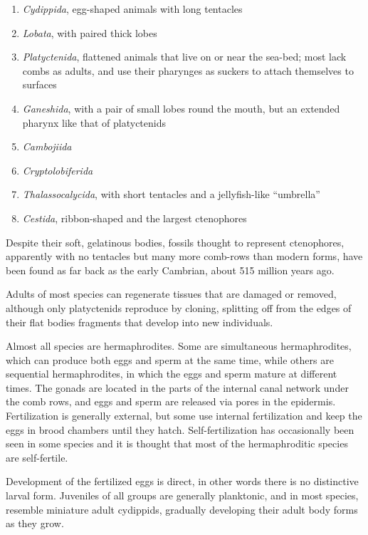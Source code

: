\documentclass[]{book}
\providecommand{\tightlist}{%
  \setlength{\itemsep}{0pt}\setlength{\parskip}{0pt}}
\theoremstyle{definition}
\theoremstyle{definition}
\theoremstyle{definition}
\theoremstyle{remark}
\begin{document}
\begin{enumerate}
\def\labelenumi{\arabic{enumi}.}
\tightlist
\item
  \emph{Cydippida}, egg-shaped animals with long tentacles
\item
  \emph{Lobata}, with paired thick lobes
\item
  \emph{Platyctenida}, flattened animals that live on or near the
  sea-bed; most lack combs as adults, and use their pharynges as suckers
  to attach themselves to surfaces
\item
  \emph{Ganeshida}, with a pair of small lobes round the mouth, but an
  extended pharynx like that of platyctenids
\item
  \emph{Cambojiida}
\item
  \emph{Cryptolobiferida}
\item
  \emph{Thalassocalycida}, with short tentacles and a jellyfish-like
  ``umbrella''
\item
  \emph{Cestida}, ribbon-shaped and the largest ctenophores
\end{enumerate}

Despite their soft, gelatinous bodies, fossils thought to represent
ctenophores, apparently with no tentacles but many more comb-rows than
modern forms, have been found as far back as the early Cambrian, about
515 million years ago.

Adults of most species can regenerate tissues that are damaged or
removed, although only platyctenids reproduce by cloning, splitting off
from the edges of their flat bodies fragments that develop into new
individuals.

Almost all species are hermaphrodites. Some are simultaneous
hermaphrodites, which can produce both eggs and sperm at the same time,
while others are sequential hermaphrodites, in which the eggs and sperm
mature at different times. The gonads are located in the parts of the
internal canal network under the comb rows, and eggs and sperm are
released via pores in the epidermis. Fertilization is generally
external, but some use internal fertilization and keep the eggs in brood
chambers until they hatch. Self-fertilization has occasionally been seen
in some species and it is thought that most of the hermaphroditic
species are self-fertile.

Development of the fertilized eggs is direct, in other words there is no
distinctive larval form. Juveniles of all groups are generally
planktonic, and in most species, resemble miniature adult cydippids,
gradually developing their adult body forms as they grow.
\end{document}
